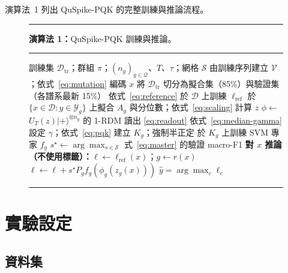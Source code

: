 \documentclass[10pt,a4paper]{article}
\begin{document}
演算法~1 列出 QuSpike-PQK 的完整訓練與推論流程。

\begin{figure}[!htb]
    \centering
    \begin{minipage}{0.92\textwidth}
    \hrule\smallskip
    \noindent\textbf{演算法 1：}QuSpike-PQK 訓練與推論。
    \smallskip\hrule\smallskip
    \small
    \begin{algorithmic}[1]
        \REQUIRE 訓練集 $\mathcal{D}_{\mathrm{tr}}$；群組 $\pi$；$(n_g)_{g\in\mathcal{Q}}$、$T$、$\tau$；網格 $\mathcal{S}$
        \STATE 由訓練序列建立 $\mathcal{V}$；依式~\eqref{eq:mutation} 編碼 $x$
        \STATE 將 $\mathcal{D}_{\mathrm{tr}}$ 切分為擬合集（85\%）與驗證集（各譜系最新 15\%）
            \STATE 依式~\eqref{eq:reference} 於 $\mathcal{D}$ 上訓練 $\ell_{\mathrm{ref}}$
                \STATE 於 $\{x\in\mathcal{D}:y\in\mathcal{Y}_g\}$ 上擬合 $A_g$ 與分位數；依式~\eqref{eq:scaling} 計算 $z$
                \STATE $\phi\leftarrow$ $U_T(z)|{+}\rangle^{\otimes n_g}$ 的 1-RDM 讀出 \eqref{eq:readout} 
                \STATE 依式~\eqref{eq:median-gamma} 設定 $\gamma$；依式~\eqref{eq:pqk} 建立 $K_g$；強制半正定
                \STATE 於 $K_g$ 上訓練 SVM 專家 $f_g$
            \ENDFOR
                \STATE $s^{\star}\leftarrow\arg\max_{s\in\mathcal{S}}$ 式~\eqref{eq:master} 的驗證 macro-F1
            \ENDIF
        \ENDFOR
        \STATE \textbf{對 $x$ 推論（不使用標籤）：}$\ell\leftarrow\ell_{\mathrm{ref}}(x)$；$g\leftarrow r(x)$
            \STATE $\ell\leftarrow\ell+s^{\star}P_g f_g(\phi_g(z_g(x)))$
        \ENDIF
        \RETURN $\hat{y}=\arg\max_c\ell_c$
    \end{algorithmic}
    \smallskip\hrule
    \end{minipage}
\end{figure}

\FloatBarrier
\section{實驗設定}
\label{sec:setup}

\subsection{資料集}
\label{sec:dataset}
\end{document}
